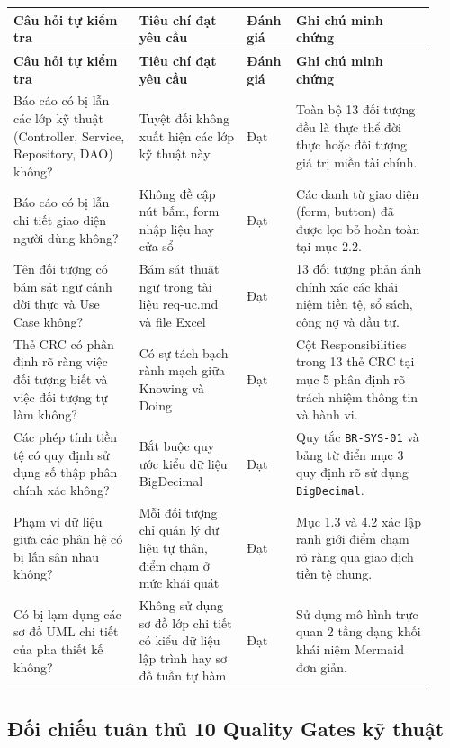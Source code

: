 \documentclass[11pt,a4paper]{article}
\newcommand{\code}[1]{\texttt{#1}}
\newcommand{\lthead}[1]{%
  \hline#1\\\hline\endfirsthead
  \hline#1\\\hline\endhead
}
\newenvironment{smalltable}{\begingroup\footnotesize\renewcommand{\arraystretch}{1.25}\setlength{\tabcolsep}{3pt}}{\endgroup}
\begin{document}
\begin{smalltable}
\begin{longtable}{|L{0.29\linewidth}|L{0.24\linewidth}|L{0.09\linewidth}|L{0.31\linewidth}|}
\lthead{\textbf{Câu hỏi tự kiểm tra} & \textbf{Tiêu chí đạt yêu cầu} & \textbf{Đánh giá} & \textbf{Ghi chú minh chứng}}
Báo cáo có bị lẫn các lớp kỹ thuật (Controller, Service, Repository, DAO) không? & Tuyệt đối không xuất hiện các lớp kỹ thuật này & Đạt & Toàn bộ 13 đối tượng đều là thực thể đời thực hoặc đối tượng giá trị miền tài chính. \\ \hline
Báo cáo có bị lẫn chi tiết giao diện người dùng không? & Không đề cập nút bấm, form nhập liệu hay cửa sổ & Đạt & Các danh từ giao diện (form, button) đã được lọc bỏ hoàn toàn tại mục 2.2. \\ \hline
Tên đối tượng có bám sát ngữ cảnh đời thực và Use Case không? & Bám sát thuật ngữ trong tài liệu req-uc.md và file Excel & Đạt & 13 đối tượng phản ánh chính xác các khái niệm tiền tệ, sổ sách, công nợ và đầu tư. \\ \hline
Thẻ CRC có phân định rõ ràng việc đối tượng biết và việc đối tượng tự làm không? & Có sự tách bạch rành mạch giữa Knowing và Doing & Đạt & Cột Responsibilities trong 13 thẻ CRC tại mục 5 phân định rõ trách nhiệm thông tin và hành vi. \\ \hline
Các phép tính tiền tệ có quy định sử dụng số thập phân chính xác không? & Bắt buộc quy ước kiểu dữ liệu BigDecimal & Đạt & Quy tắc \code{BR-SYS-01} và bảng từ điển mục 3 quy định rõ sử dụng \code{BigDecimal}. \\ \hline
Phạm vi dữ liệu giữa các phân hệ có bị lấn sân nhau không? & Mỗi đối tượng chỉ quản lý dữ liệu tự thân, điểm chạm ở mức khái quát & Đạt & Mục 1.3 và 4.2 xác lập ranh giới điểm chạm rõ ràng qua giao dịch tiền tệ chung. \\ \hline
Có bị lạm dụng các sơ đồ UML chi tiết của pha thiết kế không? & Không sử dụng sơ đồ lớp chi tiết có kiểu dữ liệu lập trình hay sơ đồ tuần tự hàm & Đạt & Sử dụng mô hình trực quan 2 tầng dạng khối khái niệm Mermaid đơn giản. \\ \hline
\end{longtable}
\end{smalltable}

\subsection{Đối chiếu tuân thủ 10 Quality Gates kỹ thuật}
\end{document}
